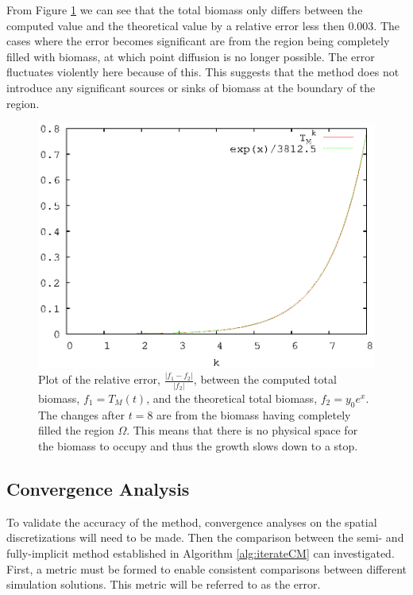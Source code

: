  From Figure \ref{fig:basic_growth} we can see that the total biomass only differs between the computed value and the theoretical value by a relative error less then $0.003$.
  The cases where the error becomes significant are from the region being completely filled with biomass, at which point diffusion is no longer possible.
  The error fluctuates violently here because of this.
  This suggests that the method does not introduce any significant sources or sinks of biomass at the boundary of the region.

  \begin{figure}
    \centering
    \includegraphics[scale = 0.9]{basic_growth}
    \caption{Plot of the relative error, $\frac{|f_1 - f_2|}{|f_2|}$, between the computed total biomass, $f_1 = T_{M}(t)$, and the theoretical total biomass, $f_2 = y_0 e^x$. 
      The changes after $t = 8$ are from the biomass having completely filled the region $\Omega$.
      This means that there is no physical space for the biomass to occupy and thus the growth slows down to a stop.}
    \label{fig:basic_growth}
  \end{figure}
  

\subsection{Convergence Analysis}
  To validate the accuracy of the method, convergence analyses on the spatial discretizations will need to be made. 
  Then the comparison between the semi- and fully-implicit method established in Algorithm \ref{alg:iterateCM} can investigated.
  First, a metric must be formed to enable consistent comparisons between different simulation solutions. 
  This metric will be referred to as the error. %

